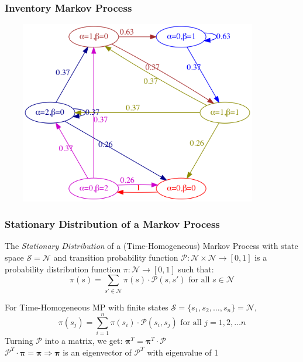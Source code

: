 \documentclass[handout]{beamer}
\begin{document}
\begin{frame}
\frametitle{Inventory Markov Process}
\includegraphics[width=12cm, height=8cm]{simple_inv_mp.png}
\end{frame}

\begin{frame}
\frametitle{Stationary Distribution of a Markov Process}
\pause
\begin{definition} 
 The {\em Stationary Distribution} of a (Time-Homogeneous) Markov Process with state space $\mathcal{S} = \mathcal{N}$ and transition probability function $\mathcal{P}: \mathcal{N} \times \mathcal{N} \rightarrow [0, 1]$ is a probability distribution function $\pi: \mathcal{N} \rightarrow [0, 1]$ such that:
  $$\pi(s) = \sum_{s'\in \mathcal{N}} \pi(s) \cdot \mathcal{P}(s, s') \text{ for all } s \in \mathcal{N}$$
\end{definition}
\pause
For Time-Homogeneous MP with finite states $\mathcal{S} = \{s_1, s_2, \ldots, s_n\} = \mathcal{N}$,
$$\pi(s_j) = \sum_{i=1}^n \pi(s_i) \cdot \mathcal{P}(s_i, s_j) \text{ for all } j = 1, 2, \ldots n$$
\pause
Turning $\mathcal{P}$ into a matrix, we get: $\bm{\pi}^T = \bm{\pi}^T \cdot \bm{\mathcal{P}}$\\
\pause
$\bm{\mathcal{P}}^T \cdot \bm{\pi}= \bm{\pi} \Rightarrow \bm{\pi}$ is an eigenvector of $\bm{\mathcal{P}}^T$ with eigenvalue of 1
\end{frame}
\end{document}
